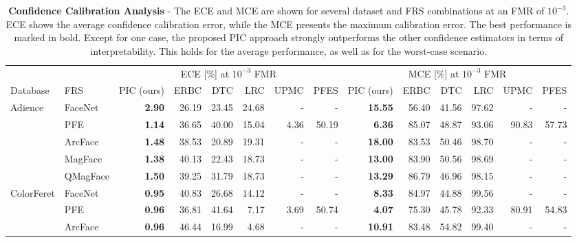 \documentclass[10pt,twocolumn,letterpaper]{article}
\begin{document}
\begin{table*}[ht]
\small
\renewcommand{\arraystretch}{1.0}
\setlength{\tabcolsep}{2.8pt}
\centering
\caption{\textbf{Confidence Calibration Analysis} - The ECE and MCE are shown for several dataset and FRS combinations at an FMR of $10^{-3}$.
ECE shows the average confidence calibration error, while the MCE presents the maximum calibration error. The best performance is marked in bold.
Except for one case, the proposed PIC approach strongly outperforms the other confidence estimators in terms of interpretability. This holds for the average performance, as well as for the worst-case scenario.}
\label{tab:CalibrationAnalysis}
\begin{tabular}{llrrrrrrrrrrrr}
\Xhline{2\arrayrulewidth}
           &          & \multicolumn{6}{c}{ECE [\%] at $10^{-3}$ FMR}  & \multicolumn{6}{c}{MCE [\%] at $10^{-3}$ FMR}    \\
           \cmidrule(rl){3-8} \cmidrule(rl){9-14} 
Database   & FRS      & PIC (ours) & ERBC  & DTC   & LRC   & UPMC & PFES  & PIC (ours) & ERBC  & DTC   & LRC   & UPMC   & PFES \\
\hline
Adience    & FaceNet  & \textbf{2.90}       & 26.19 & 23.45 & 24.68 & -    & -     & \textbf{15.55}      & 56.40 & 41.56 & 97.62 & -      & -     \\
           & PFE      & \textbf{1.14}       & 36.65 & 40.00 & 15.04 & 4.36 & 50.19 & \textbf{6.36}       & 85.07 & 48.87 & 93.06 & 90.83  & 57.73   \\
           & ArcFace  & \textbf{1.48}       & 38.53 & 20.89 & 19.31 & -    & -     & \textbf{18.00}      & 83.53 & 50.46 & 98.70 & -      & -     \\
           & MagFace  & \textbf{1.38}       & 40.13 & 22.43 & 18.73 & -    & -     & \textbf{13.00}      & 83.90 & 50.56 & 98.69 & -      & -     \\
           & QMagFace & \textbf{1.50}       & 39.25 & 31.79 & 18.73 & -    & -     & \textbf{13.29}      & 86.79 & 46.96 & 98.15 & -      & -     \\
\hline
ColorFeret & FaceNet  & \textbf{0.95}       & 40.83 & 26.68 & 14.12 & -    & -     & \textbf{8.33}       & 84.97 & 44.88 & 99.56 & -      & -     \\
           & PFE      & \textbf{0.96}       & 36.81 & 41.64 & 7.17  & 3.69 & 50.74 & \textbf{4.07}       & 75.30 & 45.78 & 92.33 & 80.91  & 54.83 \\
           & ArcFace  & \textbf{0.96}       & 46.44 & 16.99 & 4.68  & -    & -     & \textbf{10.91}      & 83.48 & 54.82 & 99.40 & -      & -     \\

\end{tabular}
\end{table*}
\end{document}
